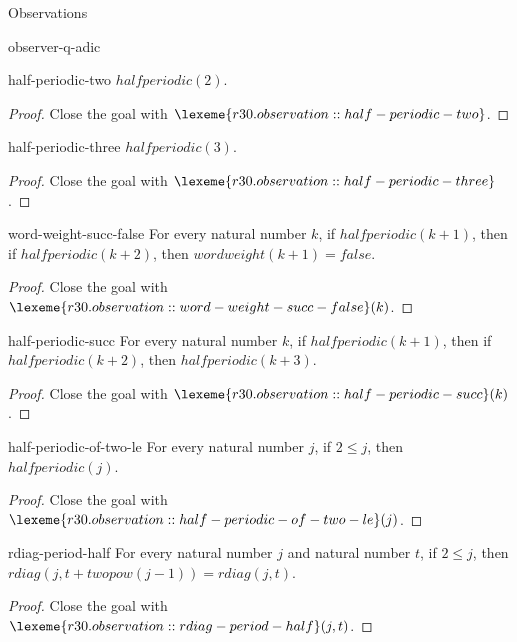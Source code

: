 \begin{lexlean}{Observations}
\begin{section}{observer-q-adic}
\begin{theorem}{half-periodic-two}
\(halfperiodic(2)\).
\begin{proof}
Close the goal with \(\lexeme{r30.observation::half-periodic-two}\).
\end{proof}
\end{theorem}

\begin{theorem}{half-periodic-three}
\(halfperiodic(3)\).
\begin{proof}
Close the goal with \(\lexeme{r30.observation::half-periodic-three}\).
\end{proof}
\end{theorem}

\begin{theorem}{word-weight-succ-false}
For every natural number \(k\), if \(halfperiodic(k + 1)\), then if \(halfperiodic(k + 2)\), then \(wordweight(k + 1) = false\).
\begin{proof}
Close the goal with \(\lexeme{r30.observation::word-weight-succ-false}(k)\).
\end{proof}
\end{theorem}

\begin{theorem}{half-periodic-succ}
For every natural number \(k\), if \(halfperiodic(k + 1)\), then if \(halfperiodic(k + 2)\), then \(halfperiodic(k + 3)\).
\begin{proof}
Close the goal with \(\lexeme{r30.observation::half-periodic-succ}(k)\).
\end{proof}
\end{theorem}

\begin{theorem}{half-periodic-of-two-le}
For every natural number \(j\), if \(2 ≤ j\), then \(halfperiodic(j)\).
\begin{proof}
Close the goal with \(\lexeme{r30.observation::half-periodic-of-two-le}(j)\).
\end{proof}
\end{theorem}

\begin{theorem}{rdiag-period-half}
For every natural number \(j\) and natural number \(t\), if \(2 ≤ j\), then \(rdiag(j, t + twopow(j - 1)) = rdiag(j, t)\).
\begin{proof}
Close the goal with \(\lexeme{r30.observation::rdiag-period-half}(j, t)\).
\end{proof}
\end{theorem}


\end{section}
\end{lexlean}
